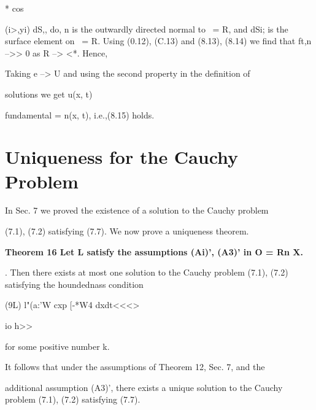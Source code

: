 * cos

\begin{ocrformula}
(i>,yi) dS,, do,
n is the outwardly   directed normal   to \y\ = R, and dSi; is the surface
element on \y\ = R. Using    (0.12), (C.13) and (8.13), (8.14) we find that
ft,n -->> 0 as R --> <*. Hence,
\end{ocrformula}

\begin{ocrformula}
Taking    e --> U and using the second property     in the definition                      of
\end{ocrformula}

solutions we get u(x, t)

\begin{ocrformula}
fundamental                       = n(x, t), i.e.,(8.15) holds.
\end{ocrformula}

\section{Uniqueness for the Cauchy Problem}
In Sec. 7 we proved the existence of a solution to the Cauchy problem

\begin{ocrformula}
(7.1), (7.2) satisfying        (7.7). We     now      prove   a uniqueness   theorem.
\end{ocrformula}

\medskip\noindent\textbf{Theorem 16 Let L satisfy the assumptions (Ai)', (A3)' in O = Rn X.} 
\begin{ocrformula}
[0, 2']. Then     there exists at most one solution to the Cauchy   problem                    (7.1),
(7.2) satisfying the houndednass            condition
\end{ocrformula}

\begin{ocrformula}
(9L)                              l"(a:'W     cxp [-*W4          dxdt<<<>
\end{ocrformula}

io h>>

for some positive number k.

It follows that under the assumptions of Theorem 12, Sec. 7, and the

\begin{ocrformula}
additional     assumption       (A3)', there exists a unique solution to the Cauchy
problem      (7.1), (7.2) satisfying       (7.7).
\end{ocrformula}

